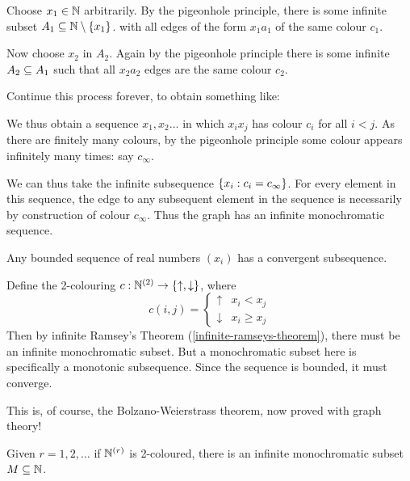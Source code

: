 \documentclass{article}
\begin{document}
\begin{prf}
    Choose $x_1 \in \mathbb{N}$ arbitrarily. By the pigeonhole principle, there is some infinite subset $A_1 \subseteq \mathbb{N} \setminus \left\lbrace x_1 \right\rbrace$. with all edges of the form $x_1a_1$ of the same colour $c_1$.
    
    Now choose $x_2$ in $A_2$. Again by the pigeonhole principle there is some infinite $A_2 \subseteq A_1$ such that all $x_2a_2$ edges are the same colour $c_2$.
    
    Continue this process forever, to obtain something like:
    
    
    We thus obtain a sequence $x_1, x_2 \dots$ in which $x_i x_j$ has colour $c_i$ for all $i < j$. As there are finitely many colours, by the pigeonhole principle some colour appears infinitely many times: say $c_\infty$.
    
    We can thus take the infinite subsequence $\left\lbrace x_i : c_i = c_\infty \right\rbrace$. For every element in this sequence, the edge to any subsequent element in the sequence is necessarily by construction of colour $c_\infty$. Thus the graph has an infinite monochromatic sequence.
\end{prf}

\begin{corollary}
    Any bounded sequence of real numbers $(x_i)$ has a convergent subsequence.
\end{corollary}

\begin{prf}
    Define the 2-colouring $c: \mathbb{N}^{(2)} \to \left\lbrace \uparrow, \downarrow \right\rbrace$, where
    \[
	c(i, j) = \begin{cases}
		\uparrow & x_i < x_j \\
		\downarrow & x_i \geq x_j
	\end{cases}
	\]
	Then by infinite Ramsey's Theorem (\ref{infinite-ramseys-theorem}), there must be an infinite monochromatic subset. But a monochromatic subset here is specifically a monotonic subsequence. Since the sequence is bounded, it must converge.
\end{prf}

\begin{note}
	This is, of course, the Bolzano-Weierstrass theorem, now proved with graph theory!
\end{note}

\begin{theorem}
    \label{infinite-ramseys-theorem-sets}
    Given $r = 1, 2, \dots$ if $\mathbb{N}^{(r)}$ is 2-coloured, there is an infinite monochromatic subset $M \subseteq \mathbb{N}$.
\end{theorem}
\end{document}
